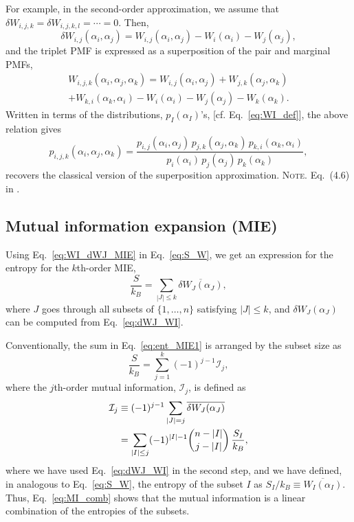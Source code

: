 \documentclass[reprint, superscriptaddress]{revtex4-1}
\newcommand{\note}[1]{{\color{DarkGreen}\footnotesize \textsc{Note.} #1}}
\newcommand{\MI}{\mathcal I} %
\begin{document}
For example,
in the second-order approximation,
we assume that
$\delta W_{i, j, k} = \delta W_{i,j,k, l} = \cdots = 0$.
%
Then,
$$\delta W_{i, j}(\alpha_i, \alpha_j)
= W_{i,j}(\alpha_i, \alpha_j) - W_i(\alpha_i) - W_j(\alpha_j),$$
and the triplet PMF is expressed as a superposition
of the pair and marginal PMFs,
\begin{align*}
W_{i,j,k}(\alpha_i, \alpha_j, \alpha_k)
=
W_{i,j}(\alpha_i, \alpha_j) + W_{j,k}(\alpha_j, \alpha_k)\\
  + W_{k,i}(\alpha_k, \alpha_i)
  - W_i(\alpha_i) - W_j(\alpha_j) - W_k(\alpha_k)
.
\end{align*}
%
Written in terms of the distributions, $p_I(\alpha_I)$'s,
[cf. Eq.~\eqref{eq:WI_def}], the above relation gives
%
$$
p_{i,j,k}(\alpha_i, \alpha_j, \alpha_k)
=
\frac{ p_{i,j}(\alpha_i, \alpha_j) \, p_{j,k}(\alpha_j, \alpha_k) \, p_{k,i}(\alpha_k, \alpha_i) }{ p_i(\alpha_i) \, p_j(\alpha_j) \, p_k(\alpha_k) }
,
$$
recovers the classical version of the superposition approximation\cite{kirkwood1935, born1946}.
\note{Eq.~(4.6) in \cite{born1946}.}

\subsection{Mutual information expansion (MIE)}


Using Eq.~\eqref{eq:WI_dWJ_MIE} in Eq.~\eqref{eq:S_W},
we get an expression for the entropy for the $k$th-order MIE,
\begin{equation}
  \frac{S}{k_B}
  =
  \sum_{|J| \le k} \overline{ \delta W_J(\alpha_J) },
  \label{eq:ent_MIE1}
\end{equation}
where $J$ goes through all subsets of $\{1, \dots, n\}$ satisfying $|J| \le k$,
and $\delta W_J(\alpha_J)$ can be computed from Eq.~\eqref{eq:dWJ_WI}.

Conventionally, the sum in Eq.~\eqref{eq:ent_MIE1}
is arranged by the subset size as
\begin{equation}
  \frac{S}{k_B}
  =
  \sum_{j = 1}^k (-1)^{j-1} \MI_j
  ,
  \label{eq:S_MIE}
\end{equation}
%
where the $j$th-order mutual information, $\MI_j$, is defined as
\begin{align}
  \MI_j
  &\equiv (-1)^{j-1} \sum_{|J| = j} \overline{ \delta W_J(\alpha_J) }
  \notag \\
  &=
  \sum_{ |I| \le j }
  (-1)^{|I| - 1}
  {n - |I| \choose j - |I|}
  \, \frac{S_I}{k_B}
  ,
  \label{eq:MI_comb}
\end{align}
where we have used Eq.~\eqref{eq:dWJ_WI}
in the second step,
and we have defined, in analogous to Eq.~\eqref{eq:S_W},
the entropy of the subset $I$ as
$S_I / k_B \equiv \overline{ W_I(\alpha_I) }$.
%
Thus, Eq.~\eqref{eq:MI_comb} shows that
the mutual information is a linear combination of
the entropies of the subsets.
\end{document}
